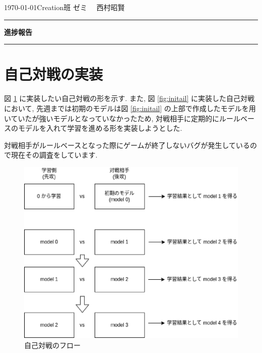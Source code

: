 \documentclass{jarticle}     %
\begin{document}
  \noindent
  \hspace{1em}

  \today Creation班 ゼミ
  \hfill
  \ \  西村昭賢 

  \vspace{2mm}
  \hrule
  \begin{center}
  {\Large \bf 進捗報告}
  \end{center}
  \hrule
  \vspace{3mm}


\section{自己対戦の実装}
図 \ref{fig:selfplay} に実装したい自己対戦の形を示す.
また, 図 \ref{fig:initail} に実装した自己対戦において, 先週までは初期のモデルは図 \ref{fig:initail} の上部で作成したモデルを用いていたが強いモデルとなっていなかったため, 対戦相手に定期的にルールベースのモデルを入れて学習を進める形を実装しようとした. \par
対戦相手がルールベースとなった際にゲームが終了しないバグが発生しているので現在その調査をしています.


\begin{figure}[ht]
  \centering
  \includegraphics[width=120mm]{assets/modelprogress.eps}
  \vspace{-0.3cm}
  \caption{自己対戦のフロー}
  \label{fig:selfplay}
\end{figure}
\end{document}
